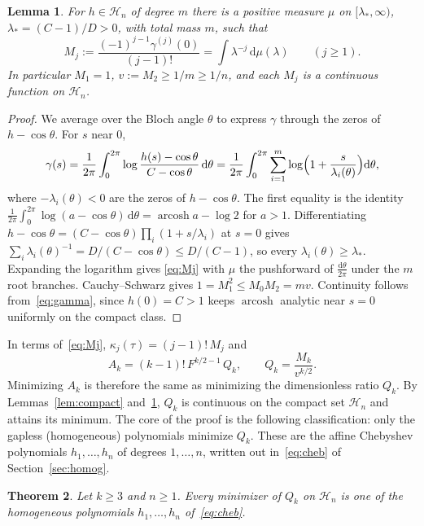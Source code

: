 \documentclass[11pt]{article}
\newtheorem{theorem}{Theorem}
\newtheorem{lemma}[theorem]{Lemma}
\theoremstyle{remark}
\newcommand{\HH}{\mathcal H}
\newcommand{\dd}{\mathrm d}
\newcommand{\acosh}{\operatorname{arcosh}}
\begin{document}
\begin{lemma}\label{lem:moments}
For $h\in\HH_n$ of degree $m$ there is a positive measure $\mu$ on
$[\lambda_*,\infty)$, $\lambda_*=(C-1)/D>0$, with total mass $m$, such that
\begin{equation}\label{eq:Mj}
M_j:=\frac{(-1)^{j-1}\gamma^{(j)}(0)}{(j-1)!}=\int\lambda^{-j}\,\dd\mu(\lambda)
\qquad(j\ge1).
\end{equation}
In particular $M_1=1$, $v:=M_2\ge1/m\ge1/n$, and each $M_j$ is a
continuous function on $\HH_n$.
\end{lemma}

\begin{proof}
We average over the Bloch angle $\theta$ to express $\gamma$ through the
zeros of $h-\cos\theta$. For $s$ near $0$,
\[
\gamma(s)=\frac1{2\pi}\int_0^{2\pi}\log\frac{h(s)-\cos\theta}{C-\cos\theta}\,
\dd\theta=\frac1{2\pi}\int_0^{2\pi}\sum_{i=1}^m
\log\Bigl(1+\frac s{\lambda_i(\theta)}\Bigr)\dd\theta,
\]
where $-\lambda_i(\theta)<0$ are the zeros of $h-\cos\theta$. The first
equality is the identity
$\frac1{2\pi}\int_0^{2\pi}\log(a-\cos\theta)\,\dd\theta=\acosh a-\log2$ for
$a>1$. Differentiating $h-\cos\theta=(C-\cos\theta)\prod_i(1+s/\lambda_i)$
at $s=0$ gives $\sum_i\lambda_i(\theta)^{-1}=D/(C-\cos\theta)\le D/(C-1)$,
so every $\lambda_i(\theta)\ge\lambda_*$. Expanding the logarithm gives
\eqref{eq:Mj} with $\mu$ the pushforward of $\frac{\dd\theta}{2\pi}$ under
the $m$ root branches. Cauchy--Schwarz gives $1=M_1^2\le M_0M_2=mv$.
Continuity follows from~\eqref{eq:gamma}, since $h(0)=C>1$ keeps $\acosh$
analytic near $s=0$ uniformly on the compact class.
\end{proof}

In terms of~\eqref{eq:Mj}, $\kappa_j(\tau)=(j-1)!\,M_j$ and
\begin{equation}\label{eq:Qk}
A_k=(k-1)!\,F^{k/2-1}\,Q_k,\qquad Q_k=\frac{M_k}{v^{k/2}}.
\end{equation}
Minimizing $A_k$ is therefore the same as minimizing the dimensionless
ratio $Q_k$. By Lemmas~\ref{lem:compact} and~\ref{lem:moments}, $Q_k$ is
continuous on the compact set $\HH_n$ and attains its minimum. The core of
the proof is the following classification: only the gapless (homogeneous)
polynomials minimize $Q_k$. These are the affine Chebyshev polynomials
$h_1,\dots,h_n$ of degrees $1,\dots,n$, written out in~\eqref{eq:cheb} of
Section~\ref{sec:homog}.

\begin{theorem}\label{thm:poly}
Let $k\ge3$ and $n\ge1$. Every minimizer of $Q_k$ on $\HH_n$ is one of the
homogeneous polynomials $h_1,\dots,h_n$ of~\eqref{eq:cheb}.
\end{theorem}
\end{document}
